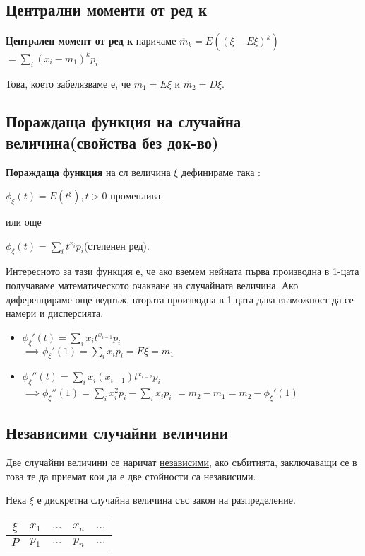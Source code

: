 \documentclass[fleqn,12pt]{article}
\begin{document}
\begin{justify}
\subsection{Централни моменти от ред к}
\textbf{Централен момент от ред к} наричаме $\mathring{m_k} = E((\xi - E\xi)^k) $
$= \sum_i (x_i-m_1)^kp_i$

Това, което забелязваме е, че $m_1 = E\xi$ и $\mathring{m_2} = D\xi$.

\subsection{Пораждаща функция на случайна величина(свойства без док-во)}
\textbf{Пораждаща функция} на сл величина $\xi$ дефинираме така :

$\phi_\xi(t) = E(t^\xi), t > 0$ променлива

или още 

$\phi_\xi(t) = \sum_i t^{x_i}p_i$(степенен ред).

Интересното за тази функция е, че ако вземем нейната първа производна в 1-цата получаваме математическото очакване на 
случайната величина. Ако диференцираме още веднъж, втората производна в 1-цата дава възможност да се намери и 
дисперсията.
\begin{itemize}
    \item $\phi_\xi'(t) = \sum_{i} x_it^{x_{i-1}}p_i$\\
    $\implies  \phi_\xi'(1) = \sum_{i} x_ip_i = E\xi = m_1$
    \item $\phi_\xi''(t) = \sum_{i} x_i(x_{i-1})t^{x_{i-2}}p_i$\\
    $\implies \phi_\xi''(1)=\sum_{i} x_i^2p_i - \sum_{i} x_ip_i$
    $= m_2 - m_1  = m_2 - \phi_\xi'(1)$
\end{itemize}

\subsection{Независими случайни величини}
Две случайни величини се наричат \underline{независими}, ако събитията, заключаващи се в това те да приемат кои да е 
две стойности са независими.

Нека $\xi$ е дискретна случайна величина със закон на разпределение.\\
\begin{tabular}{|c|c|c|c|c|}
    \hline
    $\xi$ & $x_1$ & $\dots$ & $x_n$ & $\dots$ \\
    \hline
    $P$ & $p_1$ & $\dots$ & $p_n$ & $\dots$ \\
    \hline
\end{tabular}


\end{justify}
\end{document}
